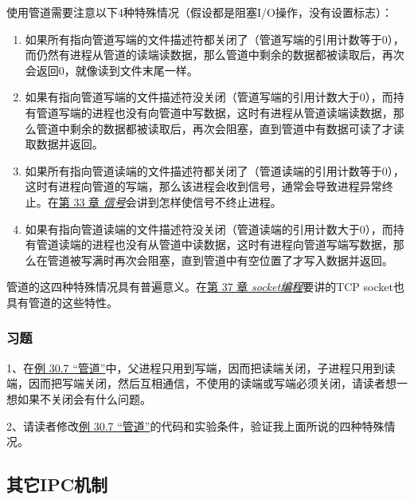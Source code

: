 使用管道需要注意以下4种特殊情况（假设都是阻塞I/\BookSplit{}O操作，没有设置标志）：


\begin{enumerate}

\item 如果所有指向管道写端的文件描述符都关闭了（管道写端的引用计数等于0），而仍然有进程从管道的读端读数据，那么管道中剩余的数据都被读取后，再次会返回0，就像读到文件末尾一样。

\item 如果有指向管道写端的文件描述符没关闭（管道写端的引用计数大于0），而持有管道写端的进程也没有向管道中写数据，这时有进程从管道读端读数据，那么管道中剩余的数据都被读取后，再次会阻塞，直到管道中有数据可读了才读取数据并返回。

\item 如果所有指向管道读端的文件描述符都关闭了（管道读端的引用计数等于0），这时有进程向管道的写端，那么该进程会收到信号，通常会导致进程异常终止。在\hyperlink{db.ch33.id2883851}{第 33 章 \emph{信号}}会讲到怎样使信号不终止进程。

\item 如果有指向管道读端的文件描述符没关闭（管道读端的引用计数大于0），而持有管道读端的进程也没有从管道中读数据，这时有进程向管道写端写数据，那么在管道被写满时再次会阻塞，直到管道中有空位置了才写入数据并返回。
\end{enumerate}


管道的这四种特殊情况具有普遍意义。在\hyperlink{db.ch37.id2902803}{第 37 章 \emph{socket编程}}要讲的TCP socket也具有管道的这些特性。


\subsubsection*{习题}
%


1、在\hyperlink{db.ch30s04.id2867940}{例 30.\BookSplit{}7 “管道”}中，父进程只用到写端，因而把读端关闭，子进程只用到读端，因而把写端关闭，然后互相通信，不使用的读端或写端必须关闭，请读者想一想如果不关闭会有什么问题。



2、请读者修改\hyperlink{db.ch30s04.id2867940}{例 30.\BookSplit{}7 “管道”}的代码和实验条件，验证我上面所说的四种特殊情况。


\subsection{其它IPC机制}
%


